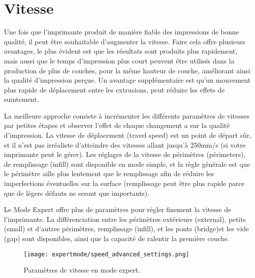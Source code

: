 
\section{Vitesse} %
\label{sec:speed}

Une fois que l'imprimante produit de mani\`ere fiable des impressions de bonne qualit\'e, il peut \^etre souhaitable d'augmenter la vitesse. Faire cela offre plusieurs avantages, le plus \'evident est que les r\'esultats sont produits plus rapidement, mais aussi que le temps d'impression plus court peuvent \^etre utilis\'es dans la production de plus de couches, pour la m\^eme hauteur de couche, am\'eliorant ainsi la qualit\'e d'impression perçue. Un avantage suppl\'ementaire est qu'un mouvement plus rapide de d\'eplacement entre les extrusions, peut r\'eduire les effets de suintement.

La meilleure approche consiste \`a incr\'ementer les diff\'erents param\`etres de vitesses par petites \'etapes et observer l'effet de chaque changement a sur la qualit\'e d'impression. La vitesse de d\'eplacement (travel speed) est un point de d\'epart s\^ur, et il n'est pas irr\'ealiste d'atteindre des vitesses allant jusqu'\`a 250mm/s (si votre imprimante peut le g\'erer). Les r\'eglages de la vitesse de p\'erim\`etres (p\'erimeters), de remplissage (infill) sont disponible en mode simple, et la r\`egle g\'en\'erale est que le p\'erim\`etre aille plus lentement que le remplissage afin de r\'eduire les imperfections \'eventuelles sur la surface (remplissage peut \^etre plus rapide parce que de l\'egers d\'efauts ne seront que importants).

Le Mode Expert offre plus de param\`etres pour r\'egler finement la vitesse de l'imprimante. La diff\'erenciation entre les p\'erim\`etres ext\'erieurs (external), petits (small) et d'autres p\'erim\`etres, remplissage (infill), et les ponts (bridge)et les vide (gap) sont disponibles, ainsi que la capacit\'e de ralentir la premi\`ere couche.

\begin{figure}[H]
\centering
\texttt{[image: expertmode/speed\_advanced\_settings.png]}
\caption{Param\`etres de vitesse en mode expert.}
\label{fig:speed_advanced_settings}
\end{figure}


